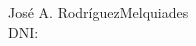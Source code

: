 \vskip 0.6cm
\begin{center}
José  \hspace{.1cm}A.\hspace{.1cm} Rodríguez\hspace{.1cm}Melquiades\\
 DNI:
\end{center}

